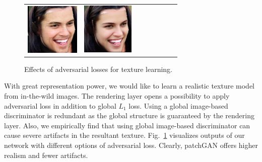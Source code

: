 \begin{figure}[t!]
\begin{center}
\begin{tabular}{c@{\hskip 1.5mm}c@{\hskip 1mm}c@{\hskip 1.5mm}c@{\hskip 1mm}c@{\hskip 1.5mm}c@{\hskip 1mm}c@{\hskip 1mm}c@{}}
\includegraphics[width=\AblTexFigWid]{img/Ablation/ImgGAN2.png} &
\includegraphics[width=\AblTexFigWid]{img/Ablation/PatchGAN2.png} &
\end{tabular}
\vspace{-2mm}
\caption{\small Effects of adversarial losses for texture learning.}
\label{fig:abl_tex}
\figvspace \vspace{-2mm}
\end{center}
\end{figure}

With great representation power, we would like to learn a realistic texture model from in-the-wild images. 
The rendering layer opens a possibility to apply adversarial loss in addition to global $L_1$ loss. 
%
Using a global image-based discriminator is redundant as the global structure is guaranteed by the rendering layer. 
Also, we empirically find that using global image-based discriminator can cause severe artifacts in the resultant texture. 
Fig.~\ref{fig:abl_tex} visualizes outputs of our network with different options of adversarial loss. 
Clearly, patchGAN offers higher realism and fewer artifacts.
